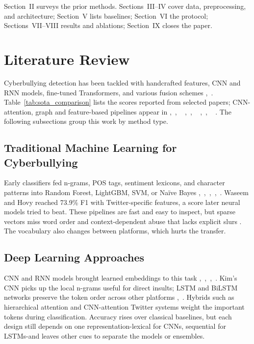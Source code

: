 Section~II surveys the prior methods. Sections~III--IV cover data, preprocessing, and architecture; Section~V lists baselines; Section~VI the protocol; Sections~VII--VIII results and ablations; Section~IX closes the paper.

\section{Literature Review}

Cyberbullying detection has been tackled with handcrafted features, CNN and RNN models, fine-tuned Transformers, and various fusion schemes \cite{ref12},~\cite{ref13}. Table~\ref{tab:sota_comparison} lists the scores reported from selected papers; CNN-attention, graph and feature-based pipelines appear in \cite{ref17},~\cite{ref26}, ~ \cite{ref27},~\cite{ref28}, ~ \cite{ref29},~\cite{ref30}, ~ \cite{ref31}. The following subsections group this work by method type.

\subsection{Traditional Machine Learning for Cyberbullying}

Early classifiers fed n-grams, POS tags, sentiment lexicons, and character patterns into Random Forest, LightGBM, SVM, or Na\"ive Bayes \cite{ref2},~\cite{ref5},~\cite{ref6},~\cite{ref18},~\cite{ref31}. Waseem and Hovy \cite{ref2} reached 73.9\% F1 with Twitter-specific features, a score later neural models tried to beat. These pipelines are fast and easy to inspect, but sparse vectors miss word order and context-dependent abuse that lacks explicit slurs \cite{ref12}. The vocabulary also changes between platforms, which hurts the transfer.

\subsection{Deep Learning Approaches}

CNN and RNN models brought learned embeddings to this task \cite{ref3},~\cite{ref7},~\cite{ref8},~\cite{ref13}. Kim's CNN \cite{ref7} picks up the local n-grams useful for direct insults; LSTM and BiLSTM networks preserve the token order across other platforms \cite{ref8},~\cite{ref13}. Hybrids such as hierarchical attention \cite{ref30} and CNN-attention Twitter systems \cite{ref26} weight the important tokens during classification. Accuracy rises over classical baselines, but each design still depends on one representation-lexical for CNNs, sequential for LSTMs-and leaves other cues to separate the models or ensembles.

